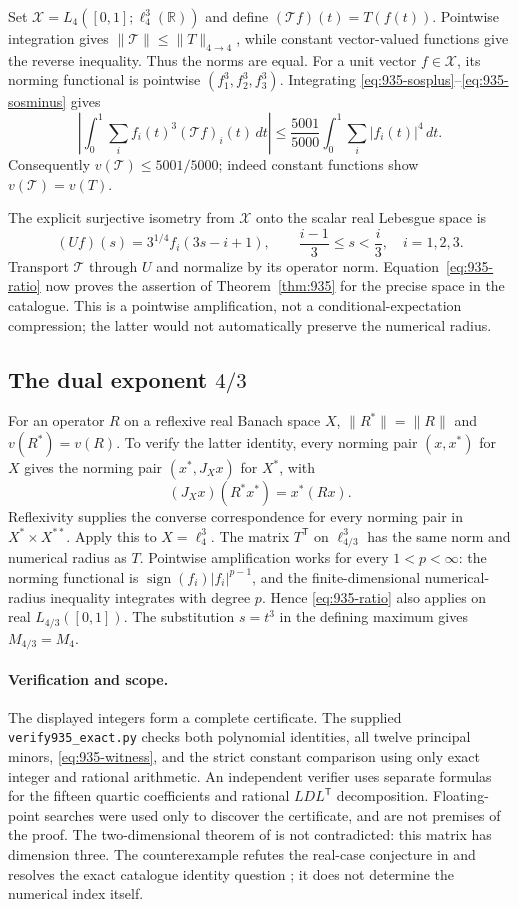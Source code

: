 \documentclass[11pt,a4paper]{article}
\theoremstyle{remark}
\begin{document}
Set $\mathcal X=L_4([0,1];\ell_4^3(\mathbb R))$ and define
$(\mathcal T f)(t)=T(f(t))$. Pointwise integration gives
$\|\mathcal T\|\le\|T\|_{4\to4}$, while constant vector-valued functions
give the reverse inequality. Thus the norms are equal. For a unit vector
$f\in\mathcal X$, its norming functional is pointwise $(f_1^3,f_2^3,f_3^3)$.
Integrating \eqref{eq:935-sosplus}--\eqref{eq:935-sosminus} gives
\[
 \left|\int_0^1\sum_i f_i(t)^3(\mathcal T f)_i(t)\,dt\right|
 \le\frac{5001}{5000}\int_0^1\sum_i|f_i(t)|^4\,dt.
\]
Consequently $v(\mathcal T)\le5001/5000$; indeed constant functions show
$v(\mathcal T)=v(T)$.

The explicit surjective isometry from $\mathcal X$ onto the scalar real
Lebesgue space is
\[
 (Uf)(s)=3^{1/4}f_i(3s-i+1),\qquad
 \frac{i-1}{3}\le s<\frac{i}{3},\quad i=1,2,3.
\]
Transport $\mathcal T$ through $U$ and normalize by its operator norm.
Equation~\eqref{eq:935-ratio} now proves the assertion of
Theorem~\ref{thm:935} for the precise space in the catalogue.
This is a pointwise amplification, not a conditional-expectation
compression; the latter would not automatically preserve the numerical
radius.

\subsection{The dual exponent \texorpdfstring{$4/3$}{4/3}}

For an operator $R$ on a reflexive real Banach space $X$,
$\|R^*\|=\|R\|$ and $v(R^*)=v(R)$. To verify the latter identity, every
norming pair $(x,x^*)$ for $X$ gives the norming pair $(x^*,J_Xx)$ for
$X^*$, with
\[
 (J_Xx)(R^*x^*)=x^*(Rx).
\]
Reflexivity supplies the converse correspondence for every norming pair in
$X^*\times X^{**}$.
Apply this to $X=\ell_4^3$. The matrix $T^{\mathsf T}$ on
$\ell_{4/3}^3$ has the same norm and numerical radius as $T$.
Pointwise amplification works for every $1<p<\infty$: the norming functional
is $\operatorname{sign}(f_i)|f_i|^{p-1}$, and the finite-dimensional
numerical-radius inequality integrates with degree $p$.
Hence \eqref{eq:935-ratio} also applies on real $L_{4/3}([0,1])$.
The substitution $s=t^3$ in the defining maximum gives $M_{4/3}=M_4$.

\paragraph{Verification and scope.}
The displayed integers form a complete certificate. The supplied
\texttt{verify935\_exact.py} checks both polynomial identities, all twelve
principal minors, \eqref{eq:935-witness}, and the strict constant comparison
using only exact integer and rational arithmetic. An independent verifier
uses separate formulas for the fifteen quartic coefficients and rational
$LDL^{\mathsf T}$ decomposition. Floating-point searches were used only to
discover the certificate, and are not premises of the proof.
The two-dimensional theorem of \cite{Chiclana2026} is not contradicted:
this matrix has dimension three. The counterexample refutes the real-case conjecture in
\cite[Problem~5.1]{MMM2011} and resolves the exact catalogue identity
question \cite{AIM}; it does not determine the numerical index itself.
\end{document}
